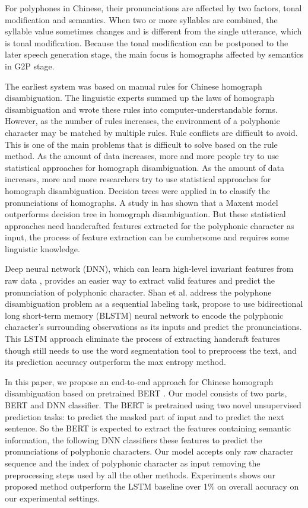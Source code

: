 \documentclass[a4paper]{article}
\begin{document}
For polyphones in Chinese, their pronunciations are affected by two factors, tonal modification and semantics. \cite{lilinhui2010} When two or more syllables are combined, the syllable value sometimes changes and is different from the single utterance, which is tonal modification. Because the tonal modification can be postponed to the later speech generation stage, the main focus is homographs affected by semantics in G2P stage.

The earliest system was based on manual rules for Chinese homograph disambiguation.\cite{dajunzhang2000, lianhongcai1995} The linguistic experts summed up the laws of homograph disambiguation and wrote these rules into computer-understandable forms. However, as the number of rules increases, the environment of a polyphonic character may be matched by multiple rules. Rule conflicts are difficult to avoid. This is one of the main problems that is difficult to solve based on the rule method. As the amount of data increases, more and more people try to use statistical approaches for homograph disambiguation.
As the amount of data increases, more and more researchers try to use statistical approaches for homograph disambiguation. Decision trees were applied in \cite{wang1996broad} to classify the pronunciations of homographs. A study in \cite{fangzhouliu2007} has shown that a Maxent model outperforms decision tree in homograph disambiguation. But these statistical approaches need handcrafted features extracted for the polyphonic character as input, the process of feature extraction can be cumbersome and requires some linguistic knowledge.

Deep neural network (DNN), which can learn high-level invariant features from raw data \cite{bengio2013representation}, provides an easier way to extract valid features and predict the pronunciation of polyphonic character. Shan et al. \cite{shan2016bi} address the polyphone disambiguation problem as a sequential labeling task, propose to use bidirectional long short-term memory (BLSTM) neural network to encode the polyphonic character’s surrounding observations as its inputs and predict the pronunciations. This LSTM approach eliminate the process of extracting handcraft features though still needs to use the word segmentation tool to preprocess the text, and its prediction accuracy outperform the max entropy method.

In this paper, we propose an end-to-end approach for Chinese homograph disambiguation based on pretrained BERT \cite{devlin2018bert}. Our model consists of two parts, BERT and DNN classifier. The BERT is pretrained using two novel unsupervised prediction tasks: to predict the masked part of input and to predict the next sentence. So the BERT is expected to extract the features containing semantic information, the following DNN classifiers these features to predict the pronunciations of polyphonic characters. Our model accepts only raw character sequence and the index of polyphonic character as input removing the preprocessing steps used by all the other methods. Experiments shows our proposed method outperform the LSTM baseline over 1\% on overall accuracy on our experimental settings.
\end{document}
